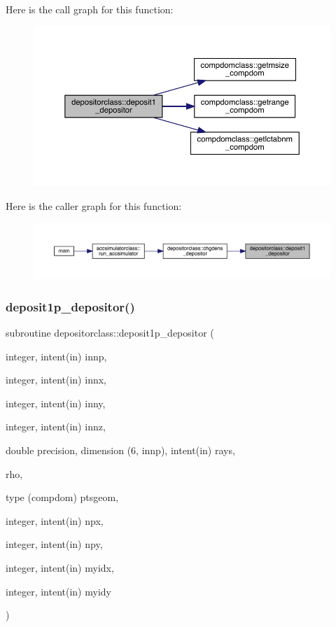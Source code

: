 Here is the call graph for this function\+:\nopagebreak
\begin{figure}[H]
\begin{center}
\leavevmode
\includegraphics[width=350pt]{namespacedepositorclass_acb64300f2b31d40a2d4741c4475ae10a_cgraph}
\end{center}
\end{figure}
Here is the caller graph for this function\+:\nopagebreak
\begin{figure}[H]
\begin{center}
\leavevmode
\includegraphics[width=350pt]{namespacedepositorclass_acb64300f2b31d40a2d4741c4475ae10a_icgraph}
\end{center}
\end{figure}
\mbox{\label{namespacedepositorclass_a1f57e8a4537070af145a196172e3ba85}} 
\subsubsection{\texorpdfstring{deposit1p\_depositor()}{deposit1p\_depositor()}}
{\footnotesize\ttfamily subroutine depositorclass\+::deposit1p\+\_\+depositor (\begin{DoxyParamCaption}\item[{integer, intent(in)}]{innp,  }\item[{integer, intent(in)}]{innx,  }\item[{integer, intent(in)}]{inny,  }\item[{integer, intent(in)}]{innz,  }\item[{double precision, dimension (6, innp), intent(in)}]{rays,  }\item[{}]{rho,  }\item[{type (compdom)}]{ptsgeom,  }\item[{integer, intent(in)}]{npx,  }\item[{integer, intent(in)}]{npy,  }\item[{integer, intent(in)}]{myidx,  }\item[{integer, intent(in)}]{myidy }\end{DoxyParamCaption})}



